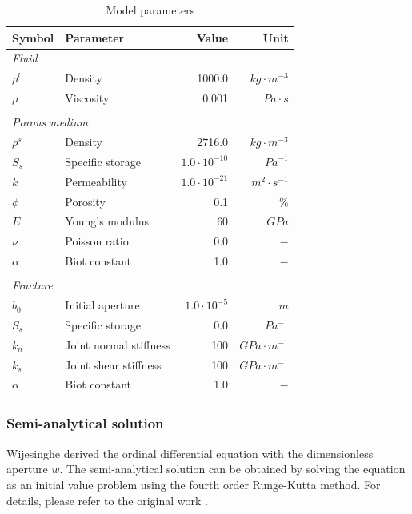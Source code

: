 \begin{table}[!htb]
\centering
\caption{Model parameters}
\label{tbl:ex_hm_single_setting}
\begin{tabular}{llrr}
\toprule
Symbol & Parameter & Value & Unit \\
\midrule
\multicolumn{4}{l}{\textit{Fluid}}  \\ 
$\rho^l$ & Density & 1000.0 & $kg \cdot m^{-3}$ \\  
$\mu$ & Viscosity & 0.001 & $Pa \cdot s$ \\  \\ 
\multicolumn{4}{l}{\textit{Porous medium}}  \\  
$\rho^s$ & Density & 2716.0 & $kg \cdot m^{-3}$ \\ 
$S_s$ & Specific storage & $1.0\cdot 10^{-10}$ & ${Pa}^{-1}$ \\ 
$k$ & Permeability & $1.0\cdot 10^{-21}$ & $ m^2 \cdot s^{-1}$ \\ 
$\phi$ & Porosity & 0.1  & $ \%$ \\ 
$E$ & Young's modulus & 60 & $ GPa$ \\ 
$\nu$ & Poisson ratio & 0.0 & $-$ \\ 
$\alpha$ & Biot constant & 1.0 & $-$ \\  \\
\multicolumn{4}{l}{\textit{Fracture}}  \\  
$b_0$ & Initial aperture & $1.0\cdot 10^{-5}$ & $m$ \\ 
$S_s$ & Specific storage & 0.0 & $Pa^{-1}$ \\ 
$k_n$ & Joint normal stiffness & 100 & $GPa \cdot m^{-1}$ \\ 
$k_s$ & Joint shear stiffness & 100 & $GPa \cdot m^{-1}$ \\ 
$\alpha$ & Biot constant & 1.0 & $-$ \\ 
\bottomrule
\end{tabular}
\end{table}

\subsubsection*{Semi-analytical solution}
Wijesinghe \cite{Wijesinghe1986} derived the ordinal differential equation with the dimensionless aperture $w$. The semi-analytical solution can be obtained by solving the equation as an initial value problem using the fourth order Runge-Kutta method. For details, please refer to the original work \cite{Wijesinghe1986}. %

